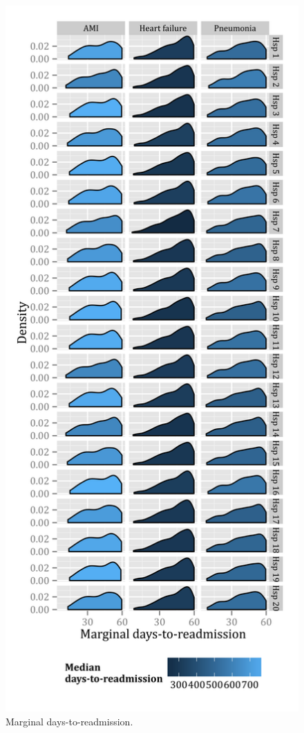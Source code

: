 \documentclass[]{article}\usepackage[]{graphicx}\usepackage[]{color}
\begin{document}
\begin{figure}[H]
    \centerline{
      \includegraphics{../figures/tte_distribution.png}
    }
    \caption[Marginal days-to-readmission.]
      {Marginal days-to-readmission.}
    \label{fig:marginal_days_to_readmission}
\end{figure}
\end{document}
